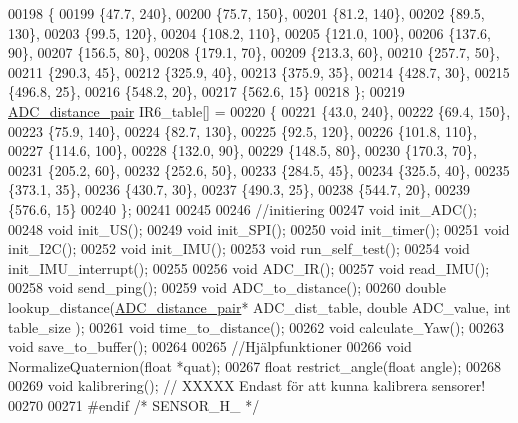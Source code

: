 \begin{DoxyCode}
00198 \{
00199     \{47.7, 240\},
00200     \{75.7, 150\},
00201     \{81.2, 140\},
00202     \{89.5, 130\},
00203     \{99.5, 120\},
00204     \{108.2, 110\},
00205     \{121.0, 100\},
00206     \{137.6, 90\},
00207     \{156.5, 80\},
00208     \{179.1, 70\},
00209     \{213.3, 60\},
00210     \{257.7, 50\},
00211     \{290.3, 45\},
00212     \{325.9, 40\},
00213     \{375.9, 35\},
00214     \{428.7, 30\},
00215     \{496.8, 25\},
00216     \{548.2, 20\},
00217     \{562.6, 15\}
00218 \};
00219 \hyperlink{struct_a_d_c__distance__pair}{ADC\_distance\_pair} IR6\_table[] =
00220 \{
00221     \{43.0, 240\},
00222     \{69.4, 150\},
00223     \{75.9, 140\},
00224     \{82.7, 130\},
00225     \{92.5, 120\},
00226     \{101.8, 110\},
00227     \{114.6, 100\},
00228     \{132.0, 90\},
00229     \{148.5, 80\},
00230     \{170.3, 70\},
00231     \{205.2, 60\},
00232     \{252.6, 50\},
00233     \{284.5, 45\},
00234     \{325.5, 40\},
00235     \{373.1, 35\},
00236     \{430.7, 30\},
00237     \{490.3, 25\},
00238     \{544.7, 20\},
00239     \{576.6, 15\}
00240 \};
00241 
00245 
00246 \textcolor{comment}{//initiering}
00247 \textcolor{keywordtype}{void} init\_ADC();
00248 \textcolor{keywordtype}{void} init\_US();
00249 \textcolor{keywordtype}{void} init\_SPI();
00250 \textcolor{keywordtype}{void} init\_timer();
00251 \textcolor{keywordtype}{void} init\_I2C();
00252 \textcolor{keywordtype}{void} init\_IMU();
00253 \textcolor{keywordtype}{void} run\_self\_test();
00254 \textcolor{keywordtype}{void} init\_IMU\_interrupt();
00255 
00256 \textcolor{keywordtype}{void} ADC\_IR();
00257 \textcolor{keywordtype}{void} read\_IMU();
00258 \textcolor{keywordtype}{void} send\_ping();
00259 \textcolor{keywordtype}{void} ADC\_to\_distance();
00260 \textcolor{keywordtype}{double} lookup\_distance(\hyperlink{struct_a_d_c__distance__pair}{ADC\_distance\_pair}* ADC\_dist\_table, \textcolor{keywordtype}{double} ADC\_value, \textcolor{keywordtype}{int} table\_size
      );
00261 \textcolor{keywordtype}{void} time\_to\_distance();
00262 \textcolor{keywordtype}{void} calculate\_Yaw();
00263 \textcolor{keywordtype}{void} save\_to\_buffer();
00264 
00265 \textcolor{comment}{//Hjälpfunktioner}
00266 \textcolor{keywordtype}{void} NormalizeQuaternion(\textcolor{keywordtype}{float} *quat);
00267 \textcolor{keywordtype}{float} restrict\_angle(\textcolor{keywordtype}{float} angle);
00268 
00269 \textcolor{keywordtype}{void} kalibrering();     \textcolor{comment}{// XXXXX Endast för att kunna kalibrera sensorer!}
00270 
00271 \textcolor{preprocessor}{#endif }\textcolor{comment}{/* SENSOR\_H\_ */}\textcolor{preprocessor}{}
\end{DoxyCode}
